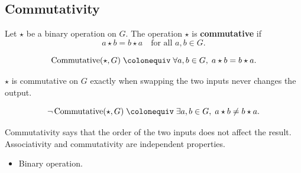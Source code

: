 \subsection{Commutativity}
\label{subsec:commutativity}

\begin{tcolorbox}[title={Definition --- Commutativity}]
\begin{definition}[Commutativity]
\label{def:commutativity}
Let $\star$ be a binary operation on $G$.
The operation $\star$ is \textbf{commutative} if
\[
a \star b = b \star a
\quad \text{for all } a,b \in G.
\]
\end{definition}
\end{tcolorbox}

\begin{remark*}
\[
\operatorname{Commutative}(\star,G)
\;\colonequiv\;
\forall a,b \in G,\; a \star b = b \star a.
\]
\end{remark*}

\begin{remark*}
$\star$ is commutative on $G$ exactly when swapping the two inputs never changes
the output.
\end{remark*}

\begin{remark*}
\[
\neg\operatorname{Commutative}(\star,G)
\;\colonequiv\;
\exists a,b\in G,\; a\star b\neq b\star a.
\]
\end{remark*}

\begin{remark*}[Interpretation]
Commutativity says that the order of the two inputs does not affect the
result.  Associativity and commutativity are independent properties.
\end{remark*}

\begin{remark*}[Dependencies]
\begin{itemize}
  \item Binary operation.
\end{itemize}
\end{remark*}

